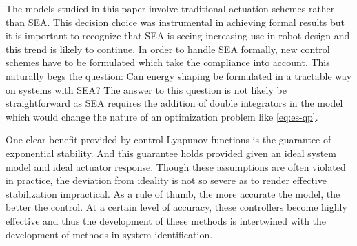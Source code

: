The models studied in this paper involve traditional actuation schemes rather
than SEA.
%
This decision choice was instrumental in achieving formal results but it is
important to recognize that SEA is seeing increasing use in robot design and
this trend is likely to continue.
%
In order to handle SEA formally, new control schemes have to be formulated which
take the compliance into account.
%
This naturally begs the question:
%
Can energy shaping be formulated in a tractable way on systems with SEA?
%
The answer to this question is not likely be straightforward as SEA requires the
addition of double integrators in the model which would change the nature of an
optimization problem like \eqref{eq:es-qp}.


One clear benefit provided by control Lyapunov functions is the guarantee of
exponential stability.
%
And this guarantee holds provided given an ideal system model and ideal actuator
response.
%
Though these assumptions are often violated in practice, the deviation from
ideality is not so severe as to render effective stabilization impractical.
%
As a rule of thumb, the more accurate the model, the better the control.
%
At a certain level of accuracy, these controllers become highly effective and
thus the development of these methods is intertwined with the development of
methods in system identification.


